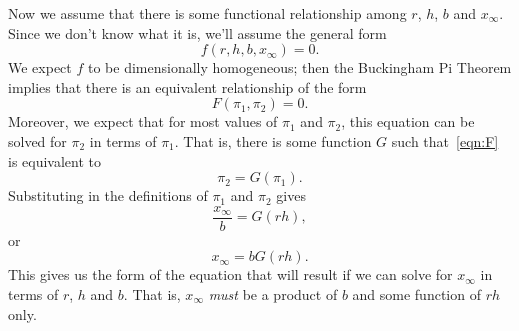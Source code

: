 Now we assume that there is some functional relationship
among $r$, $h$, $b$ and $x_{\infty}$.  Since we don't know
what it is, we'll assume the general form
\begin{equation}
  f(r,h,b,x_{\infty}) = 0.
\end{equation}
We expect $f$ to be dimensionally homogeneous; then the
Buckingham Pi Theorem implies that there is an equivalent
relationship of the form
\begin{equation}
   F(\pi_1, \pi_2) = 0.
\label{eqn:F}
\end{equation}
Moreover, we expect that for most values of $\pi_1$
and $\pi_2$, this equation can be solved for $\pi_2$
in terms of $\pi_1$. That is, there is some function
$G$ such that~\eqref{eqn:F} is equivalent to
\begin{equation}
   \pi_2 = G(\pi_1).
\end{equation}
Substituting in the definitions of $\pi_1$ and $\pi_2$ gives
\begin{equation}
   \frac{x_{\infty}}{b} = G(rh),
\end{equation}
or
\begin{equation}
   x_{\infty} = bG(rh).
\end{equation}
This gives us the form of the equation that will result if
we can solve for $x_{\infty}$ in terms of $r$, $h$ and $b$.
That is, $x_{\infty}$ \emph{must} be
a product of $b$ and some function of $rh$ only.

